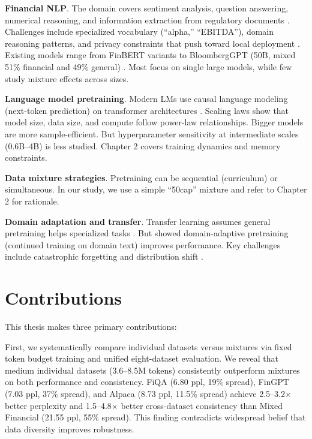 \textbf{Financial NLP}. The domain covers sentiment analysis, question answering, numerical reasoning, and information extraction from regulatory documents \parencite{araci2019finbert, chen2021finqa}. Challenges include specialized vocabulary (``alpha,'' ``EBITDA''), domain reasoning patterns, and privacy constraints that push toward local deployment \parencite{wu2023bloomberggpt}. Existing models range from FinBERT variants \parencite{araci2019finbert, yang2020finbert} to BloombergGPT (50B, mixed 51\% financial and 49\% general) \parencite{wu2023bloomberggpt}. Most focus on single large models, while few study mixture effects across sizes.

\textbf{Language model pretraining}. Modern LMs use causal language modeling (next-token prediction) on transformer architectures \parencite{vaswani2017attention, radford2019language, brown2020language}. Scaling laws \parencite{kaplan2020scaling, hoffmann2022training} show that model size, data size, and compute follow power-law relationships. Bigger models are more sample-efficient. But hyperparameter sensitivity at intermediate scales (0.6B–4B) is less studied. Chapter 2 covers training dynamics and memory constraints.

\textbf{Data mixture strategies}. Pretraining can be sequential (curriculum) or simultaneous. In our study, we use a simple “50cap” mixture and refer to Chapter 2 for rationale.

\textbf{Domain adaptation and transfer}. Transfer learning assumes general pretraining helps specialized tasks \parencite{devlin2019bert, pan2010transfer}. But \textcite{gururangan2020don} showed domain-adaptive pretraining (continued training on domain text) improves performance. Key challenges include catastrophic forgetting \parencite{kirkpatrick2017overcoming} and distribution shift \parencite{quinonero2009dataset}. 

\section{Contributions}

This thesis makes three primary contributions:

First, we systematically compare individual datasets versus mixtures via fixed token budget training and unified eight-dataset evaluation. We reveal that medium individual datasets (3.6–8.5M tokens) consistently outperform mixtures on both performance and consistency. FiQA (6.80 ppl, 19\% spread), FinGPT (7.03 ppl, 37\% spread), and Alpaca (8.73 ppl, 11.5\% spread) achieve 2.5–3.2$\times$ better perplexity and 1.5–4.8$\times$ better cross-dataset consistency than Mixed Financial (21.55 ppl, 55\% spread). This finding contradicts widespread belief that data diversity improves robustness.

